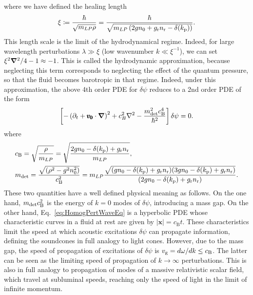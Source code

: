 where we have defined the healing length
\begin{equation}
    \xi\coloneqq\frac{\hbar}{\sqrt{m_{LP}\rho}}=\frac{\hbar}{\sqrt{m_{LP}\left(2gn_0+g_{\rm r}n_{\rm r}-\delta(k_{\mathrm{p}})\right)}}.
\end{equation}
This length scale is the limit of the hydrodynamical regime. Indeed, for large wavelength perturbations $\lambda\gg\xi$ (low wavenumber $k\ll\xi^{-1}$), we can set  ${\xi^2}\boldsymbol{\nabla}^2/4-1\approx-1$. This is called the hydrodynamic approximation, because neglecting this term corresponds to neglecting the effect of the quantum pressure, so that the fluid becomes barotropic in that regime. Indeed,
under this approximation, the above 4th order PDE for $\delta \psi$ reduces to a 2nd order PDE of the form
\begin{equation}
    \left[-\left(\partial_t+\pmb{v_0}\cdot\boldsymbol{\nabla}\right)^2+c_B^2\nabla^2-\frac{m_{\rm det}^2 c_\mathrm{B}^4}{\hbar^2}\right]\delta \psi=0.
    \label{eq:HomogPertWaveEq}
\end{equation}
where 
\begin{equation}\label{eq:csandmdet}
\begin{split}
    &c_\mathrm{B}=\sqrt{\frac{\rho}{\mlp}}=\sqrt{\frac{2gn_0- \delta(k_\tp)+g_\mathrm{r}n_\mathrm{r}}{\mlp}},
    \\%
    &m_{\rm det}=\frac{\sqrt{(\rho^2-g^2n_0^2)}}{c_\mathrm{B}^2}=\mlp\frac{\sqrt{(gn_0- \delta(k_\tp)+g_\mathrm{r}n_\mathrm{r})(3gn_0- \delta(k_\tp)+g_\mathrm{r}n_\mathrm{r})}}{(2gn_0- \delta(k_\tp)+g_\mathrm{r}n_\mathrm{r})}.
\end{split}
\end{equation} 
These two quantities have a well defined physical meaning as follows. On the one hand, $m_{\rm det}c_\mathrm{B}^2$ is the energy of $k=0$ modes of $\delta \psi$, introducing a mass gap. On the other hand, Eq.~\eqref{eq:HomogPertWaveEq} is a hyperbolic PDE whose characteristic curves in a fluid at rest are given by $|\pmb{x}|=c_\mathrm{B} t$. These characteristics limit the speed at which acoustic excitations $\delta \psi$ can propagate information, defining the soundcones in full analogy to light cones. However, due to the mass gap, the speed of propagation of excitations of $\delta \psi$ is $v_{\rm g}=d\omega/dk\leq c_\mathrm{B}$. The latter can be seen as the limiting speed of propagation of $k\to\infty$ perturbations. This is also in full analogy to propagation of modes of a massive relativistic scalar field, which travel at subluminal speeds, reaching only the speed of light in the limit of infinite momentum.

